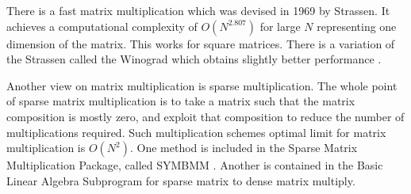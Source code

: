 There is a fast matrix multiplication which was devised in 1969 by  Strassen.  It achieves a computational complexity of $O(N^{2.807})$ for large $N$ representing one dimension of the matrix.  This works for square matrices.  There is a variation of the Strassen called the Winograd which obtains slightly better performance  \cite{lederman}.

Another view on matrix multiplication is sparse multiplication. The
whole point of sparse matrix multiplication is to take a matrix such
that the matrix composition is mostly zero, and exploit that
composition to reduce the number of multiplications required.  Such
multiplication schemes optimal limit for matrix multiplication is
$O(N^2)$. One method is included in the Sparse Matrix Multiplication
Package, called SYMBMM \cite {bank}. Another is contained in the Basic
Linear Algebra Subprogram for sparse matrix to dense matrix multiply.






